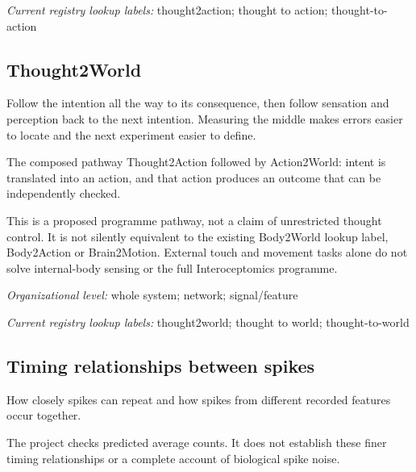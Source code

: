 \noindent\textit{Current registry lookup labels:} thought2action; thought to action; thought-to-action\par

\begin{samepage}
\subsection*{Thought2World}
\noindent Follow the intention all the way to its consequence, then follow sensation and perception back to the next intention. Measuring the middle makes errors easier to locate and the next experiment easier to define.\par
\end{samepage}
\noindent The composed pathway Thought2Action followed by Action2World: intent is translated into an action, and that action produces an outcome that can be independently checked.\par
\noindent This is a proposed programme pathway, not a claim of unrestricted thought control. It is not silently equivalent to the existing Body2World lookup label, Body2Action or Brain2Motion. External touch and movement tasks alone do not solve internal-body sensing or the full Interoceptomics programme.\par
\begin{samepage}
\noindent\textit{Organizational level:} whole system; network; signal/feature\par\nopagebreak[4]

\end{samepage}


\noindent\textit{Current registry lookup labels:} thought2world; thought to world; thought-to-world\par

\begin{samepage}
\subsection*{Timing relationships between spikes}
\noindent How closely spikes can repeat and how spikes from different recorded features occur together.\par
\end{samepage}
\begin{samepage}
\noindent The project checks predicted average counts. It does not establish these finer timing relationships or a complete account of biological spike noise.\par\nopagebreak[4]

\end{samepage}


